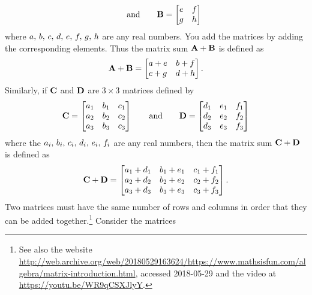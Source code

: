 \documentclass[a4paper,oneside,12pt]{article}
\begin{document}
\begin{problem}
\begin{packedenum}
\begin{equation}
    \qquad
    \text{and}
    \qquad
    \textbf{B}
    =
    \begin{bmatrix}
    e & f \\
    g & h
    \end{bmatrix}
    \end{equation}
    where ${a},\, {b},\, {c},\, {d},\, {e},\, {f},\, {g},\, {h}$ are any real numbers.
    You add the matrices by adding the corresponding elements.  Thus
    the matrix sum $\textbf{A} + \textbf{B}$ is defined as
    \[
    \textbf{A} + \textbf{B}
    =
    \begin{bmatrix}
    a + e & b + f \\
    c + g & d + h
    \end{bmatrix}.
    \]
    Similarly, if $\textbf{C}$ and $\textbf{D}$ are $3 \times 3$ matrices
    defined by
    \begin{equation}
    \label{eqn:quadratic_applications:3x3_matrices}
    \textbf{C}
    =
    \begin{bmatrix}
    a_1 & b_1 & c_1 \\
    a_2 & b_2 & c_2 \\
    a_3 & b_3 & c_3
    \end{bmatrix}
    \qquad
    \text{and}
    \qquad
    \textbf{D}
    =
    \begin{bmatrix}
    d_1 & e_1 & f_1 \\
    d_2 & e_2 & f_2 \\
    d_3 & e_3 & f_3
    \end{bmatrix}
    \end{equation}
    where the ${a_i},\, {b_i},\, {c_i},\, {d_i},\, {e_i},\, {f_i}$ are any real
    numbers, then the matrix sum $\textbf{C} + \textbf{D}$ is defined as
    \[
    \textbf{C} + \textbf{D}
    =
    \begin{bmatrix}
    a_1 + d_1 & b_1 + e_1 & c_1 + f_1 \\
    a_2 + d_2 & b_2 + e_2 & c_2 + f_2 \\
    a_3 + d_3 & b_3 + e_3 & c_3 + f_3
    \end{bmatrix}.
    \]
    Two matrices must have the same number of rows and columns in
    order that they can be added together.\footnote{
      See also the website
      \url{http://web.archive.org/web/20180529163624/https://www.mathsisfun.com/algebra/matrix-introduction.html},
      accessed 2018-05-29 and the video at
      \url{https://youtu.be/WR9qCSXJlyY}.
    }
    Consider the matrices
    \begin{equation}
    \label{eqn:quadratic_applications:matrices_for_sum_product}

\end{equation}
\end{packedenum}
\end{problem}
\end{document}
